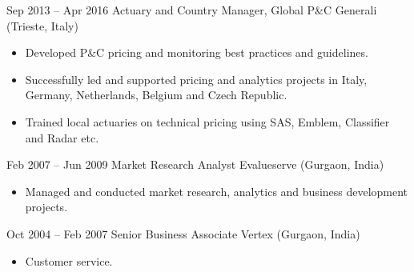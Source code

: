 \documentclass[a4paper,]{fortysecondscv}
\begin{document}
\begin{cvtable}[4]
{\begin{itemize}[nosep, leftmargin=0pt]
				\end{itemize}
			}
		\cvitem
			{Sep 2013 -- Apr 2016}
			{Actuary and Country Manager, Global P\&C}
			{Generali (Trieste, Italy)}
			{
				\vspace{-\topsep}
				\begin{itemize}[nosep, leftmargin=0pt] %
					\item Developed P\&C pricing and monitoring best practices and guidelines.
					\item Successfully led and supported pricing and analytics projects in Italy, Germany, Netherlands, Belgium and Czech Republic.
					\item Trained local actuaries on technical pricing using SAS, Emblem, Classifier and Radar etc.
				\end{itemize}
			}
		\cvitem
			{Feb 2007 -- Jun 2009}
			{Market Research Analyst}
			{Evalueserve (Gurgaon, India)}
			{
				\vspace{-\topsep}
				\begin{itemize}[nosep, leftmargin=0pt] %
					\item Managed and conducted market research, analytics and business development projects.
				\end{itemize}
			}
		\cvitem
			{Oct 2004 -- Feb 2007}
			{Senior Business Associate}
			{Vertex (Gurgaon, India)}
			{ 
				\vspace{-\topsep}
				\begin{itemize}[nosep, leftmargin=0pt] %
					\item Customer service.
				\end{itemize}
			}
	\end{cvtable}





\newpage
\makebacksidebar

\end{document}
